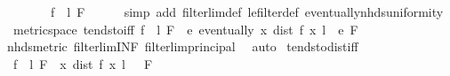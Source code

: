 \begin{isabellebody}
\ \ \isamarkupfalse%
\isanewline
\ \ \isamarkupfalse%
\ \isamarkupfalse%
\ {\isacartoucheopen}{\isacharparenleft}{\kern0pt}f\ {\isasymlonglongrightarrow}\ l{\isacharparenright}{\kern0pt}\ F{\isacartoucheclose}\isanewline
\ \ \ \ \isamarkupfalse%
\ {\isacharparenleft}{\kern0pt}simp\ add{\isacharcolon}{\kern0pt}\ filterlim{\isacharunderscore}{\kern0pt}def\ le{\isacharunderscore}{\kern0pt}filter{\isacharunderscore}{\kern0pt}def\ eventually{\isacharunderscore}{\kern0pt}nhds{\isacharunderscore}{\kern0pt}uniformity{\isacharparenright}{\kern0pt}\isanewline
{}\isamarkupfalse%
%
\endisatagproof
{\isafoldproof}%
%
\isadelimproof
\isanewline
%
\endisadelimproof
\isanewline
{}\isamarkupfalse%
\ {\isacharparenleft}{\kern0pt}\ metric{\isacharunderscore}{\kern0pt}space{\isacharparenright}{\kern0pt}\ tendsto{\isacharunderscore}{\kern0pt}iff{\isacharcolon}{\kern0pt}\ {\isachardoublequoteopen}{\isacharparenleft}{\kern0pt}f\ {\isasymlonglongrightarrow}\ l{\isacharparenright}{\kern0pt}\ F\ {\isasymlongleftrightarrow}\ {\isacharparenleft}{\kern0pt}{\isasymforall}e{\isachargreater}{\kern0pt}{}{\isachardot}{\kern0pt}\ eventually\ {\isacharparenleft}{\kern0pt}{\isasymlambda}x{\isachardot}{\kern0pt}\ dist\ {\isacharparenleft}{\kern0pt}f\ x{\isacharparenright}{\kern0pt}\ l\ {\isacharless}{\kern0pt}\ e{\isacharparenright}{\kern0pt}\ F{\isacharparenright}{\kern0pt}{\isachardoublequoteclose}\isanewline
%
\isadelimproof
\ \ %
\endisadelimproof
%
\isatagproof
{}\isamarkupfalse%
\ nhds{\isacharunderscore}{\kern0pt}metric\ filterlim{\isacharunderscore}{\kern0pt}INF\ filterlim{\isacharunderscore}{\kern0pt}principal\ \isamarkupfalse%
\ auto%
\endisatagproof
{\isafoldproof}%
%
\isadelimproof
\isanewline
%
\endisadelimproof
\isanewline
{}\isamarkupfalse%
\ tendsto{\isacharunderscore}{\kern0pt}dist{\isacharunderscore}{\kern0pt}iff{\isacharcolon}{\kern0pt}\isanewline
\ \ {\isachardoublequoteopen}{\isacharparenleft}{\kern0pt}{\isacharparenleft}{\kern0pt}f\ {\isasymlonglongrightarrow}\ l{\isacharparenright}{\kern0pt}\ F{\isacharparenright}{\kern0pt}\ {\isasymlongleftrightarrow}\ {\isacharparenleft}{\kern0pt}{\isacharparenleft}{\kern0pt}{\isacharparenleft}{\kern0pt}{\isasymlambda}x{\isachardot}{\kern0pt}\ dist\ {\isacharparenleft}{\kern0pt}f\ x{\isacharparenright}{\kern0pt}\ l{\isacharparenright}{\kern0pt}\ {\isasymlonglongrightarrow}\ {}{\isacharparenright}{\kern0pt}\ F{\isacharparenright}{\kern0pt}{\isachardoublequoteclose}\isanewline

\end{isabellebody}
